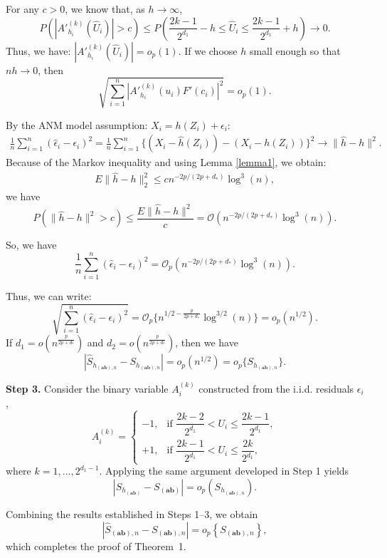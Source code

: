 \documentclass[12pt,reqno,oneside]{amsbook}
\theoremstyle{definition}
\theoremstyle{remark}
\begin{document}
For any $c>0$, we know that, as $h\to\infty$, 
$$P\left( \left| A'^{(k)}_{{h}_i}(\hat{U}_i) \right| > c \right) \leq P\left( \frac{2k-1}{2^{d_1}} - h\leq \hat{U}_i\leq 
\frac{2k-1}{2^{d_1}} + h\right)\to 0.$$ Thus, we have: $ |A'^{(k)}_{{h}_i}(\hat{U}_i)|=o_p(1)$.
If we choose $h$ small enough so that $nh\to 0$, then 
$$
\sqrt{\sum_{i=1}^{n} |A'^{(k)}_{{h}_i}(u_i)F'(c_i)|^2}=o_p(1).
$$

By the ANM model assumption: $X_i = h(Z_i) + \epsilon_i$: 
\begin{align*}
    \frac{1}{n}\sum_{i=1}^n(\hat{\epsilon}_i- \epsilon_i)^2 
    = \frac{1}{n}\sum_{i=1}^n \{(X_i - \hat{h}(Z_i)) -(X_i - h(Z_i) )\}^2 
    \to \|\hat{h} - h\|^2. %
\end{align*}
Because of the Markov inequality and using Lemma \ref{lemma1}, we obtain:
\begin{align*}
E\|\hat{h}-h\|_2^2\leq c n^{-2p/(2p+d_*)}\log^3 (n),
\end{align*}
 we have
$$
P(\|\hat{h} - h\|^2> c) \leq \frac{E\|\hat{h} - h\|^2}{c}=
\mathcal{O}(n^{-2p/(2p+d_*)}\log^3 (n)).
$$

So, we have
$$
\frac{1}{n} \sum_{i=1}^n (\hat{\epsilon}_i - \epsilon_i)^2  = \mathcal{O}_p(n^{-2p/(2p+d_* )}\log^3 (n)).
$$


Thus, we can write:
$$
\sqrt{\sum_{i=1}^n (\hat{\epsilon}_i - \epsilon_i)^2} %
= \mathcal{O}_p\{n^{1/2 - \frac{p}{2p+d_*}} \log^{3/2} (n)\}=o_p(n^{1/2}).
$$
If $d_1=o(n^{\frac{p}{2p+d_*}})$ and $d_2=o(n^{\frac{p}{2p+d_*}})$, then we have
$$
|\hat{S}_{h_{(\mathbf{ab}),n}}-S_{h_{(\mathbf{ab}),n}}|=o_p(n^{1/2})=o_p\{S_{h_{(\mathbf{ab}),n}}\}.
$$

\medskip
\textbf{Step 3.}
Consider the binary variable $A_i^{(k)}$ constructed from the i.i.d. residuals $\epsilon_i$,
\begin{equation}
\label{eq:Ai}
A_i^{(k)}=
\begin{cases}
-1, & \text{if } \dfrac{2k-2}{2^{d_1}}<U_i\le\dfrac{2k-1}{2^{d_1}},\\[0.3em]
+1, & \text{if } \dfrac{2k-1}{2^{d_1}}<U_i\le\dfrac{2k}{2^{d_1}},
\end{cases}
\end{equation}
where $k=1,\ldots,2^{d_1-1}$. Applying the same argument developed in Step 1 yields
\[
|S_{h_{(\mathbf{ab})}}-S_{(\mathbf{ab})}|
=
o_p\!\left(S_{h_{(\mathbf{ab}),n}}\right).
\]

Combining the results established in Steps 1--3, we obtain
\[
|\hat{S}_{(\mathbf{ab}),n}-S_{(\mathbf{ab}),n}|
=
o_p\!\left\{S_{(\mathbf{ab}),n}\right\},
\]
which completes the proof of Theorem~1.
\end{document}

